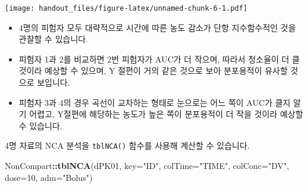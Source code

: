 \documentclass[9pt,]{krantz}
\newenvironment{Shaded}{\begin{snugshade}}{\end{snugshade}}
\newcommand{\KeywordTok}[1]{\textcolor[rgb]{0.13,0.29,0.53}{\textbf{#1}}}
\newcommand{\DataTypeTok}[1]{\textcolor[rgb]{0.13,0.29,0.53}{#1}}
\newcommand{\DecValTok}[1]{\textcolor[rgb]{0.00,0.00,0.81}{#1}}
\newcommand{\StringTok}[1]{\textcolor[rgb]{0.31,0.60,0.02}{#1}}
\newcommand{\OperatorTok}[1]{\textcolor[rgb]{0.81,0.36,0.00}{\textbf{#1}}}
\newcommand{\NormalTok}[1]{#1}
\providecommand{\tightlist}{%
  \setlength{\itemsep}{0pt}\setlength{\parskip}{0pt}}
\begin{document}
\texttt{[image: handout\_files/figure-latex/unnamed-chunk-6-1.pdf]}

\begin{itemize}
\tightlist
\item
  4명의 피험자 모두 대략적으로 시간에 따른 농도 감소가 단항 지수함수적인
  것을 관찰할 수 있습니다.\\
\item
  피험자 1과 2를 비교하면 2번 피험자가 AUC가 더 작으며, 따라서 청소율이
  더 클 것이라 예상할 수 있으며, Y 절편이 거의 같은 것으로 보아
  분포용적이 유사할 것으로 보입니다.\\
\item
  피험자 3과 4의 경우 곡선이 교차하는 형태로 눈으로는 어느 쪽이 AUC가
  클지 알기 어렵고, Y절편에 해당하는 농도가 높은 쪽이 분포용적이 더 작을
  것이라 예상할 수 있습니다.
\end{itemize}

4명 자료의 NCA 분석을 \texttt{tblNCA()} 함수를 사용해 계산할 수
있습니다.

\begin{Shaded}
\begin{Highlighting}[]
\NormalTok{NonCompart}\OperatorTok{::}\KeywordTok{tblNCA}\NormalTok{(dPK01, }\DataTypeTok{key=}\StringTok{"ID"}\NormalTok{, }\DataTypeTok{colTime=}\StringTok{"TIME"}\NormalTok{, }\DataTypeTok{colConc=}\StringTok{"DV"}\NormalTok{, }\DataTypeTok{dose=}\DecValTok{10}\NormalTok{, }\DataTypeTok{adm=}\StringTok{"Bolus"}\NormalTok{)}
\end{Highlighting}
\end{Shaded}
\end{document}

